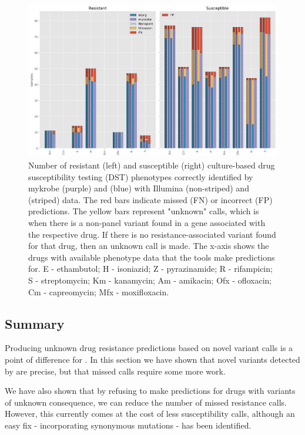 \begin{figure}
\begin{center}
\includegraphics[width=0.90\columnwidth]{Chapter3/Figs/pheno_unknown.png}
\caption{{Number of resistant (left) and susceptible (right) culture-based drug susceptibility testing (DST) phenotypes correctly identified by mykrobe (purple) and \drprg{} (blue) with Illumina (non-striped) and \ont{} (striped) data. The red bars indicate missed (FN) or incorrect (FP) predictions. The yellow bars represent \drprg{} "unknown" calls, which is when there is a non-panel variant found in a gene associated with the respective drug. If there is no resistance-associated variant found for that drug, then an unknown call is made. The x-axis shows the drugs with available phenotype data that the tools make predictions for. E - ethambutol; H - isoniazid; Z - pyrazinamide; R - rifampicin; S - streptomycin; Km - kanamycin; Am - amikacin; Ofx - ofloxacin; Cm - capreomycin; Mfx - moxifloxacin.
{\label{fig:pheno-unknown}}
}}
\end{center}
\end{figure}

\subsection{Summary}

Producing unknown drug resistance predictions based on novel variant calls is a point of difference for \drprg{}. In this section we have shown that novel variants detected by \drprg{} are precise, but that missed calls require some more work.

We have also shown that by refusing to make predictions for drugs with variants of unknown consequence, we can reduce the number of missed resistance calls. However, this currently comes at the cost of less susceptibility calls, although an easy fix - incorporating synonymous mutations - has been identified.

